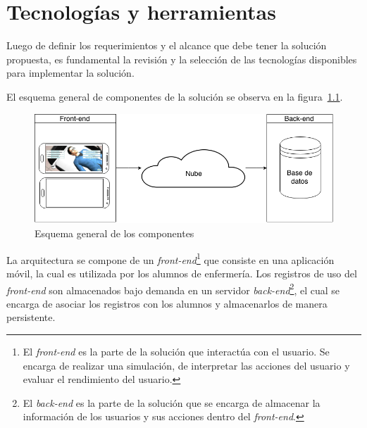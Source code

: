 \chapter{Tecnologías y herramientas}
\label{chap:tecnologias}

Luego de definir los requerimientos y el alcance que debe tener la solución propuesta, 
es fundamental la revisión y la selección de las tecnologías disponibles para
implementar la solución. 



El esquema general de componentes de la solución se observa en la figura~\ref{fig:componentes}.

\begin{figure}[H]
\begin{center}
    \includegraphics[scale=0.5]{tecnologias/images/full.png}
\end{center}
\caption{Esquema general de los componentes}
\label{fig:componentes}
\end{figure}

La arquitectura se compone de un \textit{front-end}\footnote{El \textit{front-end}
    es la parte de la solución que interactúa con el usuario. Se encarga de
    realizar una simulación, de interpretar las acciones del usuario y evaluar
    el rendimiento del usuario.} que consiste en una aplicación móvil, la cual
es utilizada por los alumnos de enfermería. Los registros de uso del \textit{front-end} son 
almacenados bajo demanda en un servidor
\textit{back-end}\footnote{El \textit{back-end} es la parte de la solución que
    se encarga de almacenar la información de los usuarios y sus acciones dentro
    del \textit{front-end}.}, el cual se encarga de asociar los registros con
los alumnos y almacenarlos de manera persistente.

